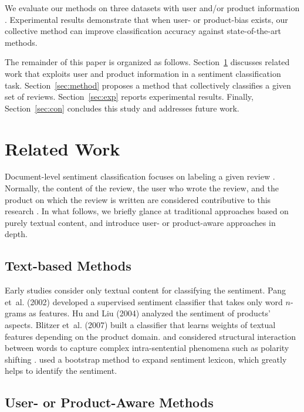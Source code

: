 \documentclass[english]{jnlp_1.4}
\begin{document}
We evaluate our methods on three datasets with user and/or product information \cite{Pang:2004,Blitzer:2007,maas:2011}.
Experimental results demonstrate that when user- or product-bias exists, our collective method can improve classification accuracy against state-of-the-art methods.

The remainder of this paper is organized as follows. 
Section~\ref{sec:related} discusses related work that exploits user and product information in a sentiment classification task. 
Section~\ref{sec:method} proposes a method that collectively classifies a given set of reviews. 
Section~\ref{sec:exp} reports experimental results. 
Finally, Section~\ref{sec:con} concludes this study and addresses future work.


\section{Related Work}
\label{sec:related}

Document-level sentiment classification focuses on labeling a given review \cite{Turney:2002}. 
Normally, the content of the review, the user who wrote the review, and the product on which the review is written are considered contributive to this research \cite{Pang:2008}.
In what follows, we briefly glance at traditional approaches based on purely textual content, and introduce user- or product-aware approaches in depth.


\subsection{Text-based Methods}

Early studies  consider only textual content for classifying the sentiment. 
Pang et~al. (2002) developed a supervised sentiment classifier that takes only word $n$-grams as features.
\nocite{Hu:2004} Hu and Liu (2004) analyzed the sentiment of products' aspects. 
\nocite{Blitzer:2007} Blitzer et~al. (2007) built a classifier that learns weights of textual features depending on the product domain. 
     and  
considered structural interaction between words to capture complex intra-sentential phenomena such as polarity shifting \cite{Li:2010}.
used a bootstrap method to expand sentiment lexicon, which greatly helps to identify the sentiment.


\subsection{User- or Product-Aware Methods}
\end{document}
